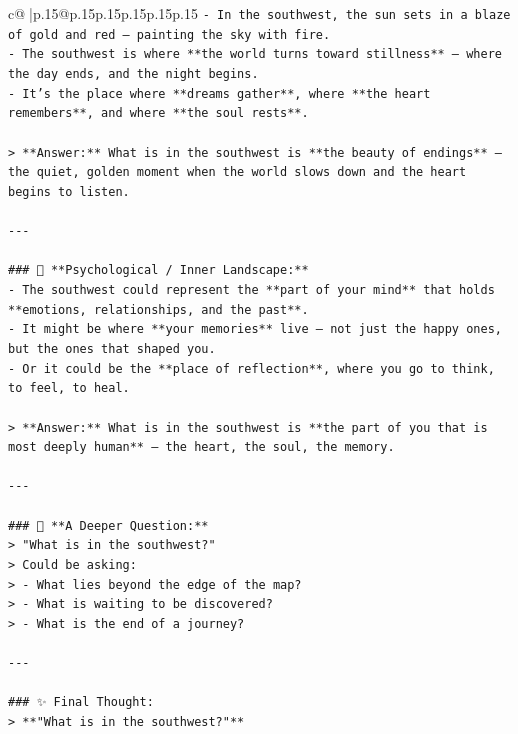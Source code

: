 \documentclass{article}
\begin{document}
{\begin{supertabular}{c@{$\;$}|p{.15\linewidth}@{}p{.15\linewidth}p{.15\linewidth}p{.15\linewidth}p{.15\linewidth}p{.15\linewidth}}
{{{\texttt{{-} In the southwest, the sun sets in a blaze of gold and red — painting the sky with fire.  } \\
\texttt{{-} The southwest is where **the world turns toward stillness** — where the day ends, and the night begins.  } \\
\texttt{{-} It’s the place where **dreams gather**, where **the heart remembers**, and where **the soul rests**.} \\
\\ 
\texttt{> **Answer:** What is in the southwest is **the beauty of endings** — the quiet, golden moment when the world slows down and the heart begins to listen.} \\
\\ 
\texttt{{-}{-}{-}} \\
\\ 
\texttt{\#\#\# 🧠 **Psychological / Inner Landscape:**} \\
\texttt{{-} The southwest could represent the **part of your mind** that holds **emotions, relationships, and the past**.  } \\
\texttt{{-} It might be where **your memories** live — not just the happy ones, but the ones that shaped you.  } \\
\texttt{{-} Or it could be the **place of reflection**, where you go to think, to feel, to heal.} \\
\\ 
\texttt{> **Answer:** What is in the southwest is **the part of you that is most deeply human** — the heart, the soul, the memory.} \\
\\ 
\texttt{{-}{-}{-}} \\
\\ 
\texttt{\#\#\# 🌅 **A Deeper Question:**} \\
\texttt{> "What is in the southwest?"  } \\
\texttt{> Could be asking:  } \\
\texttt{> {-} What lies beyond the edge of the map?  } \\
\texttt{> {-} What is waiting to be discovered?  } \\
\texttt{> {-} What is the end of a journey?} \\
\\ 
\texttt{{-}{-}{-}} \\
\\ 
\texttt{\#\#\# ✨ Final Thought:} \\
\texttt{> **"What is in the southwest?"**  } \\
}}}
\end{supertabular}}
\end{document}
